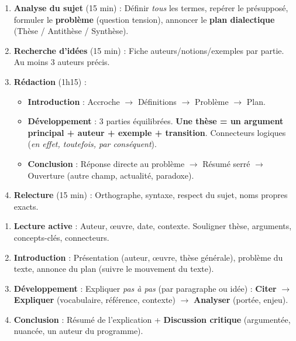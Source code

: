 \documentclass[11pt]{article}
\begin{document}
\begin{methode}
\begin{enumerate}
\item \textbf{Analyse du sujet} (15 min) : Définir \emph{tous} les termes, repérer le présupposé, formuler le \textbf{problème} (question tension), annoncer le \textbf{plan dialectique} (Thèse / Antithèse / Synthèse).
\item \textbf{Recherche d'idées} (15 min) : Fiche auteurs/notions/exemples par partie. Au moins 3 auteurs précis.
\item \textbf{Rédaction} (1h15) :
\begin{itemize}
\item \textbf{Introduction} : Accroche $\to$ Définitions $\to$ Problème $\to$ Plan.
\item \textbf{Développement} : 3 parties équilibrées. \textbf{Une thèse = un argument principal + auteur + exemple + transition}. Connecteurs logiques (\emph{en effet, toutefois, par conséquent}).
\item \textbf{Conclusion} : Réponse directe au problème $\to$ Résumé serré $\to$ Ouverture (autre champ, actualité, paradoxe).
\end{itemize}
\item \textbf{Relecture} (15 min) : Orthographe, syntaxe, respect du sujet, noms propres exacts.
\end{enumerate}
\end{methode}

\begin{methode}
\begin{enumerate}
\item \textbf{Lecture active} : Auteur, œuvre, date, contexte. Souligner thèse, arguments, concepts-clés, connecteurs.
\item \textbf{Introduction} : Présentation (auteur, œuvre, thèse générale), problème du texte, annonce du plan (suivre le mouvement du texte).
\item \textbf{Développement} : Expliquer \emph{pas à pas} (par paragraphe ou idée) : \textbf{Citer} $\to$ \textbf{Expliquer} (vocabulaire, référence, contexte) $\to$ \textbf{Analyser} (portée, enjeu).
\item \textbf{Conclusion} : Résumé de l'explication + \textbf{Discussion critique} (argumentée, nuancée, un auteur du programme).
\end{enumerate}
\end{methode}
\end{document}
